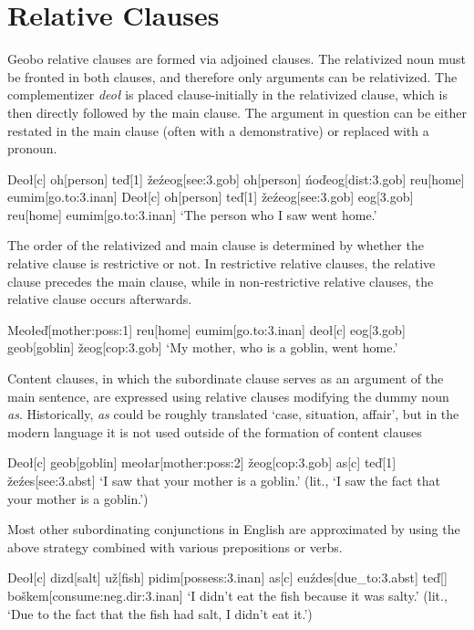 \documentclass[a4paper,11pt,oneside,openany]{memoir}
\newcommand{\vd}{ď}
\newcommand{\vz}{ž}
\newcommand{\vs}{š}
\begin{document}
\section{Relative Clauses}

Geobo{\engma} relative clauses are formed via adjoined clauses. The relativized noun must be fronted in both clauses, and therefore only arguments can be relativized. The complementizer \textit{deo\l} is placed clause-initially in the relativized clause, which is then directly followed by the main clause. The argument in question can be either restated in the main clause (often with a demonstrative) or replaced with a pronoun.

\pex
\a
\begingl
Deo{\l}[{\sc c}]
oh[person]
te{\vd}[1]
\vz e\'zeog[see:{\sc 3.gob}]
\nogloss{,}
oh[person]
\'no\vd eog[{\sc dist:3.gob}]
reu[home]
eumim[go.to:{\sc 3.inan}]
\endgl
\a
\begingl
Deo{\l}[{\sc c}]
oh[person]
te{\vd}[1]
\vz e\'zeog[see:{\sc 3.gob}]
eog[{\sc 3.gob}]
reu[home]
eumim[go.to:{\sc 3.inan}]
\glft `The person who I saw went home.'
\endgl
\xe

The order of the relativized and main clause is determined by whether the relative clause is restrictive or not. In restrictive relative clauses, the relative clause precedes the main clause, while in non-restrictive relative clauses, the relative clause occurs afterwards.

\ex
\begingl
Meo\l e\vd[mother:{\sc poss:1}]
reu[home]
eumim[go.to:{\sc 3.inan}]
\nogloss{,}
deo{\l}[{\sc c}]
eog[{\sc 3.gob}]
geob[goblin]
\vz eog[\sc cop:3.gob]
\glft `My mother, who is a goblin, went home.'
\endgl
\xe

Content clauses, in which the subordinate clause serves as an argument of the main sentence, are expressed using relative clauses modifying the dummy noun \textit{as}. Historically, \textit{as} could be roughly translated `case, situation, affair', but in the modern language it is not used outside of the formation of content clauses

\ex
\begingl
Deo{\l}[{\sc c}] 
geob[goblin]
meo\l ar[mother:{\sc poss:2}]
\vz eog[\sc cop:3.gob]
\nogloss{,}
as[{\sc c}]
te{\vd}[1]
\vz e\'zes[see:{\sc 3.abst}]
\glft `I saw that your mother is a goblin.' (lit., `I saw the fact that your mother is a goblin.')
\endgl
\xe

Most other subordinating conjunctions in English are approximated by using the above strategy combined with various prepositions or verbs.

\ex 
\begingl
Deo\l[\sc c]
dizd[salt]
\engma u\vz[fish]
pidim[possess:{\sc 3.inan}]
\nogloss{,}
as[\sc c]
euźdes[due\_to:{\sc 3.abst}]
te\vd[] 
bo\vs kem[consume:{\sc neg.dir:3.inan}]
\glft `I didn't eat the fish because it was salty.' (lit., `Due to the fact that the fish had salt, I didn't eat it.')
\endgl
\xe 
\end{document}
